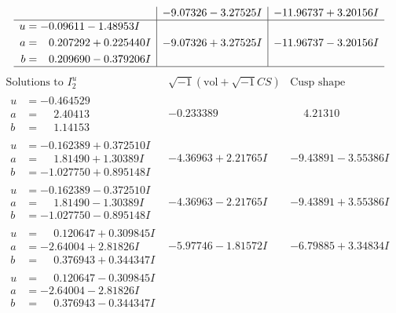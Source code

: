 \documentclass[1p]{elsarticle_modified}
\theoremstyle{definition}
\newcommand{\I}{\sqrt{-1}}
\begin{document}
$$\begin{array}{c|c|c}
 & -9.07326 - 3.27525 I & -11.96737 + 3.20156 I \\ \hline\begin{aligned}
u &= -0.09611 - 1.48953 I \\
a &= \phantom{-}0.207292 + 0.225440 I \\
b &= \phantom{-}0.209690 - 0.379206 I\end{aligned}
 & -9.07326 + 3.27525 I & -11.96737 - 3.20156 I\\
 \hline 
 \end{array}$$\newpage$$\begin{array}{c|c|c}  
\text{Solutions to }I^u_{2}& \I (\text{vol} + \sqrt{-1}CS) & \text{Cusp shape}\\
 \hline 
\begin{aligned}
u &= -0.464529\phantom{ +0.000000I} \\
a &= \phantom{-}2.40413\phantom{ +0.000000I} \\
b &= \phantom{-}1.14153\phantom{ +0.000000I}\end{aligned}
 & -0.233389\phantom{ +0.000000I} & \phantom{-}4.21310\phantom{ +0.000000I} \\ \hline\begin{aligned}
u &= -0.162389 + 0.372510 I \\
a &= \phantom{-}1.81490 + 1.30389 I \\
b &= -1.027750 + 0.895148 I\end{aligned}
 & -4.36963 + 2.21765 I & -9.43891 - 3.55386 I \\ \hline\begin{aligned}
u &= -0.162389 - 0.372510 I \\
a &= \phantom{-}1.81490 - 1.30389 I \\
b &= -1.027750 - 0.895148 I\end{aligned}
 & -4.36963 - 2.21765 I & -9.43891 + 3.55386 I \\ \hline\begin{aligned}
u &= \phantom{-}0.120647 + 0.309845 I \\
a &= -2.64004 + 2.81826 I \\
b &= \phantom{-}0.376943 + 0.344347 I\end{aligned}
 & -5.97746 - 1.81572 I & -6.79885 + 3.34834 I \\ \hline\begin{aligned}
u &= \phantom{-}0.120647 - 0.309845 I \\
a &= -2.64004 - 2.81826 I \\
b &= \phantom{-}0.376943 - 0.344347 I\end{aligned}

\end{array}$$
\end{document}
